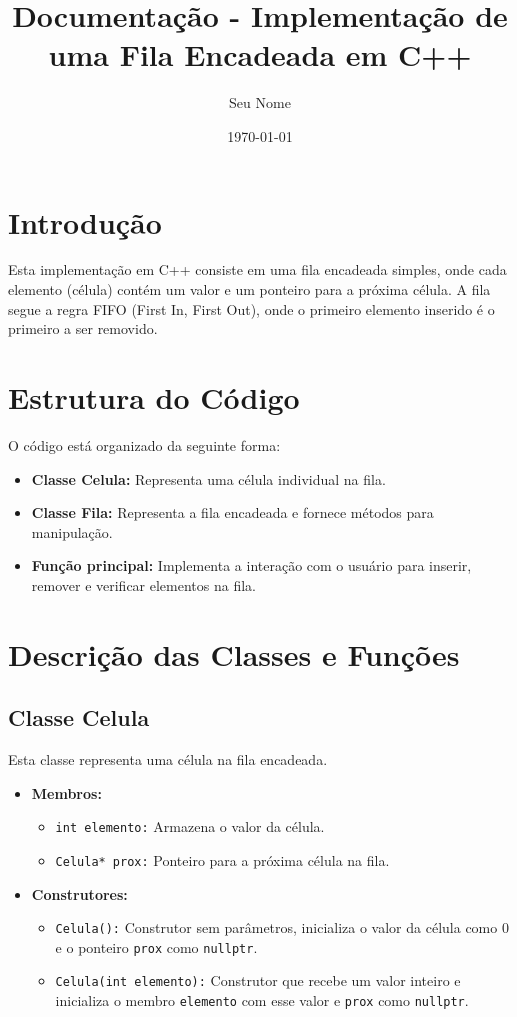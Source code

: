 \documentclass[a4paper,12pt]{article}
\title{Documentação - Implementação de uma Fila Encadeada em C++}
\author{Seu Nome}
\date{\today}
\begin{document}
\maketitle

\section{Introdução}
Esta implementação em C++ consiste em uma fila encadeada simples, onde cada elemento (célula) contém um valor e um ponteiro para a próxima célula. A fila segue a regra FIFO (First In, First Out), onde o primeiro elemento inserido é o primeiro a ser removido.

\section{Estrutura do Código}
O código está organizado da seguinte forma:
\begin{itemize}
    \item \textbf{Classe Celula:} Representa uma célula individual na fila.
    \item \textbf{Classe Fila:} Representa a fila encadeada e fornece métodos para manipulação.
    \item \textbf{Função principal:} Implementa a interação com o usuário para inserir, remover e verificar elementos na fila.
\end{itemize}

\section{Descrição das Classes e Funções}

\subsection{Classe Celula}
Esta classe representa uma célula na fila encadeada.
\begin{itemize}
    \item \textbf{Membros:}
    \begin{itemize}
        \item \texttt{int elemento:} Armazena o valor da célula.
        \item \texttt{Celula* prox:} Ponteiro para a próxima célula na fila.
    \end{itemize}
    \item \textbf{Construtores:}
    \begin{itemize}
        \item \texttt{Celula():} Construtor sem parâmetros, inicializa o valor da célula como 0 e o ponteiro \texttt{prox} como \texttt{nullptr}.
        \item \texttt{Celula(int elemento):} Construtor que recebe um valor inteiro e inicializa o membro \texttt{elemento} com esse valor e \texttt{prox} como \texttt{nullptr}.
    \end{itemize}
\end{itemize}
\end{document}
